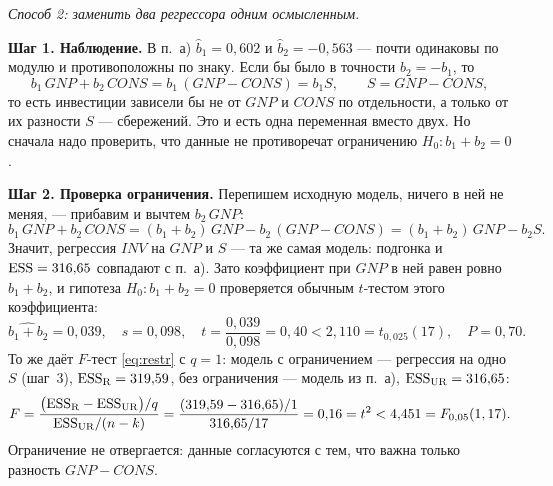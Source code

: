 \begin{solution}
\medskip
\emph{Способ 2: заменить два регрессора одним осмысленным.}

\smallskip
\textbf{Шаг 1. Наблюдение.} В п.~а) $\widehat{b}_1 = 0{,}602$ и
$\widehat{b}_2 = -0{,}563$ — почти одинаковы по модулю и противоположны по
знаку. Если бы было в точности $b_2 = -b_1$, то
\[
  b_1\,\mathit{GNP} + b_2\,\mathit{CONS}
  = b_1\,(\mathit{GNP} - \mathit{CONS}) = b_1S,
  \qquad S = \mathit{GNP} - \mathit{CONS},
\]
то есть инвестиции зависели бы не от $\mathit{GNP}$ и $\mathit{CONS}$ по
отдельности, а только от их разности $S$ — сбережений. Это и есть одна
переменная вместо двух. Но сначала надо проверить, что данные не
противоречат ограничению $H_0\colon b_1 + b_2 = 0$.

\smallskip
\textbf{Шаг 2. Проверка ограничения.} Перепишем исходную модель, ничего в ней
не меняя, — прибавим и вычтем $b_2\,\mathit{GNP}$:
\[
  b_1\,\mathit{GNP} + b_2\,\mathit{CONS}
  = (b_1 + b_2)\,\mathit{GNP} - b_2\,(\mathit{GNP} - \mathit{CONS})
  = (b_1 + b_2)\,\mathit{GNP} - b_2S .
\]
Значит, регрессия $\mathit{INV}$ на $\mathit{GNP}$ и $S$ — та же самая модель:
подгонка и $\mathrm{ESS} = 316{,}65$ совпадают с п.~а). Зато коэффициент при
$\mathit{GNP}$ в ней равен ровно $b_1 + b_2$, и гипотеза $H_0\colon b_1 + b_2 = 0$
проверяется обычным $t$-тестом этого коэффициента:
\[
  \widehat{b_1 + b_2} = 0{,}039,
  \quad s = 0{,}098,
  \quad t = \frac{0{,}039}{0{,}098} = 0{,}40 < 2{,}110 = t_{0{,}025}(17),
  \quad P = 0{,}70 .
\]
То же даёт $F$-тест \eqref{eq:restr} с $q = 1$: модель с ограничением —
регрессия на одно $S$ (шаг~3), $\mathrm{ESS}_{\mathrm{R}} = 319{,}59$, без
ограничения — модель из п.~а), $\mathrm{ESS}_{\mathrm{UR}} = 316{,}65$:
\[
  F = \frac{\bigl(\mathrm{ESS}_{\mathrm{R}} - \mathrm{ESS}_{\mathrm{UR}}\bigr)/q}
           {\mathrm{ESS}_{\mathrm{UR}}/(n-k)}
    = \frac{(319{,}59 - 316{,}65)/1}{316{,}65/17}
    = 0{,}16 = t^2 < 4{,}451 = F_{0{,}05}(1, 17).
\]
Ограничение не отвергается: данные согласуются с тем, что важна только
разность $\mathit{GNP} - \mathit{CONS}$.


\end{solution}
